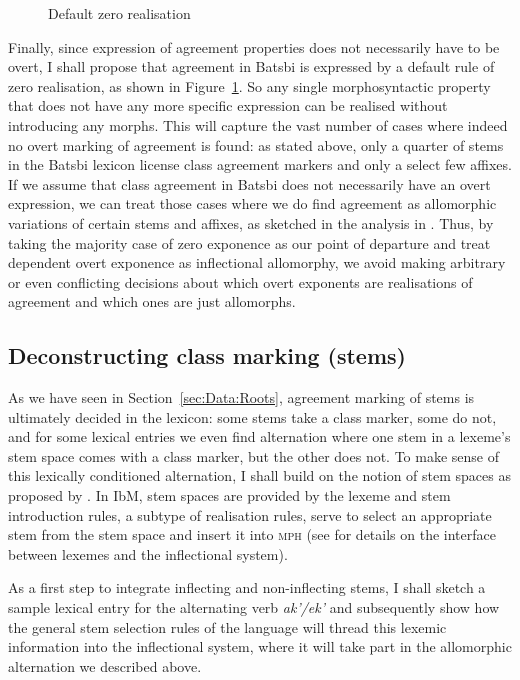 \documentclass[output=paper]{langsci/langscibook}
\begin{document}
\begin{figure}
  \caption{Default zero realisation\label{fig:IFD}}
\end{figure}

Finally, since expression of agreement properties does not necessarily
have to be overt, I shall propose that agreement in Batsbi is
expressed by a default rule of zero realisation, as shown in
Figure~\ref{fig:IFD}. So any single morphosyntactic property that
does not have any more specific expression can be realised without
introducing any morphs. This will capture the vast number of cases
where indeed no overt marking of agreement is found: as stated above,
only a quarter of stems in the Batsbi lexicon license class agreement
markers and only a select few affixes. If we assume that class
agreement in Batsbi does not necessarily have an overt expression, we
can treat those cases where we do find agreement as allomorphic
variations of certain stems and affixes, as sketched in the analysis
in . Thus, by taking the majority case of zero
exponence as our point of departure and treat dependent overt
exponence as inflectional allomorphy, we avoid making arbitrary or even
conflicting decisions about which overt exponents are realisations of
agreement and which ones are just allomorphs.

\subsection{Deconstructing class marking (stems)}

As we have seen in Section~\ref{sec:Data:Roots}, agreement marking of
stems is ultimately decided in the lexicon: some stems take a class
marker, some do not, and for some lexical entries we even find
alternation where one stem in a lexeme's stem space comes with a class
marker, but the other does not. To make sense of this lexically
conditioned alternation, I shall build on the notion of stem spaces as
proposed by \citet{Bonami06}.  In IbM, stem spaces are provided by the
lexeme and stem introduction rules, a subtype of realisation rules,
serve to select an appropriate stem from the stem space and insert it into
\textsc{mph} (see \citet{Bonami17b} for details on the interface
between lexemes and the inflectional system).

As a first step to integrate inflecting and non-inflecting stems, I
shall sketch a sample lexical entry for the alternating verb
\textit{ak'/ek'} and subsequently show how the general stem selection
rules of the language will thread this lexemic information into the
inflectional system, where it will take part in the allomorphic
alternation we described above.  
\end{document}
